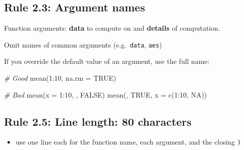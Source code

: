 \documentclass[
  letterpaper,
  DIV=11,
  numbers=noendperiod]{scrreprt}
\newenvironment{Shaded}{\begin{snugshade}}{\end{snugshade}}
\newcommand{\AttributeTok}[1]{\textcolor[rgb]{0.49,0.56,0.16}{#1}}
\newcommand{\CommentTok}[1]{\textcolor[rgb]{0.38,0.63,0.69}{\textit{#1}}}
\newcommand{\ConstantTok}[1]{\textcolor[rgb]{0.53,0.00,0.00}{#1}}
\newcommand{\DecValTok}[1]{\textcolor[rgb]{0.25,0.63,0.44}{#1}}
\newcommand{\FunctionTok}[1]{\textcolor[rgb]{0.02,0.16,0.49}{#1}}
\newcommand{\NormalTok}[1]{\textcolor[rgb]{0.00,0.44,0.13}{#1}}
\newcommand{\SpecialCharTok}[1]{\textcolor[rgb]{0.25,0.44,0.63}{#1}}
\providecommand{\tightlist}{%
  \setlength{\itemsep}{0pt}\setlength{\parskip}{0pt}}\usepackage{longtable,booktabs,array}
\begin{document}
\hypertarget{rule-2.3-argument-names}{%
\subsection{Rule 2.3: Argument names}\label{rule-2.3-argument-names}}

Function arguments: \textbf{data} to compute on and \textbf{details} of
computation.

Omit names of common arguments (e.g.~\texttt{data}, \texttt{aes})

If you override the default value of an argument, use the full name:

\begin{Shaded}
\begin{Highlighting}[]
\CommentTok{\# Good}
\FunctionTok{mean}\NormalTok{(}\DecValTok{1}\SpecialCharTok{:}\DecValTok{10}\NormalTok{, }\AttributeTok{na.rm =} \ConstantTok{TRUE}\NormalTok{)}

\CommentTok{\# Bad}
\FunctionTok{mean}\NormalTok{(}\AttributeTok{x =} \DecValTok{1}\SpecialCharTok{:}\DecValTok{10}\NormalTok{, , }\ConstantTok{FALSE}\NormalTok{)}
\FunctionTok{mean}\NormalTok{(, }\ConstantTok{TRUE}\NormalTok{, }\AttributeTok{x =} \FunctionTok{c}\NormalTok{(}\DecValTok{1}\SpecialCharTok{:}\DecValTok{10}\NormalTok{, }\ConstantTok{NA}\NormalTok{))}
\end{Highlighting}
\end{Shaded}

\hypertarget{rule-2.5-line-length-80-characters}{%
\subsection{Rule 2.5: Line length: 80
characters}\label{rule-2.5-line-length-80-characters}}

\begin{itemize}
\tightlist
\item
  use one line each for the function name, each argument, and the
  closing \texttt{)}
\end{itemize}
\end{document}
